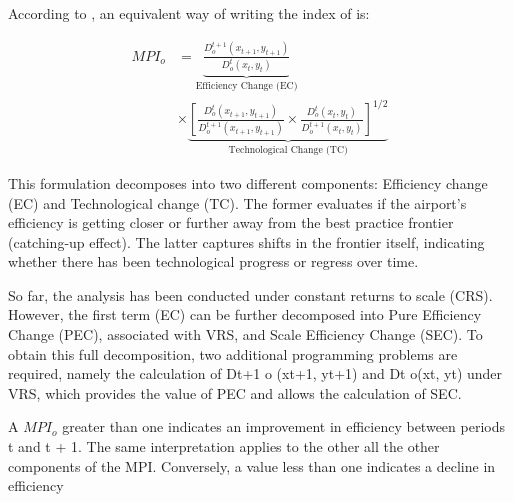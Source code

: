 According to \cite{fare1994},  an equivalent way of writing the index of  is:
\vspace{-0.5cm}

\begin{equation}
\label{eq:MPI}
\begin{aligned}
MPI_{o} &= \underbrace{\frac{D^{t+1}_{o}(x_{t+1}, y_{t+1})}{D^{t}_{o}(x_{t}, y_{t})}}_{\text{Efficiency Change (EC)}} \\
&\times \underbrace{\left[ 
\frac{D^{t}_{o}(x_{t+1}, y_{t+1})}{D^{t+1}_{o}(x_{t+1}, y_{t+1})} 
\times 
\frac{D^{t}_{o}(x_{t}, y_{t})}{D^{t+1}_{o}(x_{t}, y_{t})} 
\right]^{1/2}}_{\text{Technological Change (TC)}}
\end{aligned}
\end{equation}


This formulation decomposes  into two different components: Efficiency change (EC)
and Technological change (TC). The former evaluates if the airport’s efficiency is getting closer or further
away from the best practice frontier (catching-up effect). The latter captures shifts in the frontier itself,
indicating whether there has been technological progress or regress over time.

So far, the analysis has been conducted under constant returns to scale (CRS). However, the first
term (EC) can be further decomposed into Pure Efficiency Change (PEC), associated with VRS, and
Scale Efficiency Change (SEC). To obtain this full decomposition, two additional programming problems are required, namely the
calculation of Dt+1
o
(xt+1, yt+1) and Dt
o(xt, yt) under VRS, which provides the value of PEC and allows
the calculation of SEC.

A $MPI_{o}$ greater than one indicates an improvement in efficiency between periods t and t + 1. The
same interpretation applies to the other all the other components of the MPI. Conversely, a value less
than one indicates a decline in efficiency
